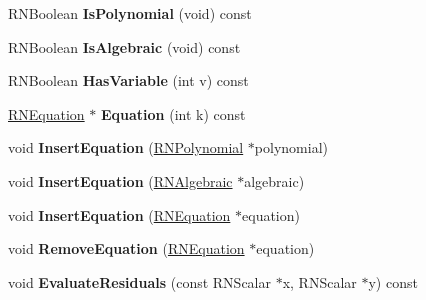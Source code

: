 \begin{DoxyCompactItemize}
\item 
R\+N\+Boolean {\bfseries Is\+Polynomial} (void) const \hypertarget{class_r_n_system_of_equations_ab83c476d4c5b85d7d35051d6e1436498}{}\label{class_r_n_system_of_equations_ab83c476d4c5b85d7d35051d6e1436498}

\item 
R\+N\+Boolean {\bfseries Is\+Algebraic} (void) const \hypertarget{class_r_n_system_of_equations_a2aebbba0c7849224dd11db3fcb0d1386}{}\label{class_r_n_system_of_equations_a2aebbba0c7849224dd11db3fcb0d1386}

\item 
R\+N\+Boolean {\bfseries Has\+Variable} (int v) const \hypertarget{class_r_n_system_of_equations_a736615d3c3239e7622c040f26d782014}{}\label{class_r_n_system_of_equations_a736615d3c3239e7622c040f26d782014}

\item 
\hyperlink{class_r_n_equation}{R\+N\+Equation} $\ast$ {\bfseries Equation} (int k) const \hypertarget{class_r_n_system_of_equations_ab4ea5976c2b1d39e9d7efb080ea87c35}{}\label{class_r_n_system_of_equations_ab4ea5976c2b1d39e9d7efb080ea87c35}

\item 
void {\bfseries Insert\+Equation} (\hyperlink{class_r_n_polynomial}{R\+N\+Polynomial} $\ast$polynomial)\hypertarget{class_r_n_system_of_equations_a2e43ff9ceb4a8b58b7c426695eb18b1a}{}\label{class_r_n_system_of_equations_a2e43ff9ceb4a8b58b7c426695eb18b1a}

\item 
void {\bfseries Insert\+Equation} (\hyperlink{class_r_n_algebraic}{R\+N\+Algebraic} $\ast$algebraic)\hypertarget{class_r_n_system_of_equations_a884c51381868c47b29227150081a4045}{}\label{class_r_n_system_of_equations_a884c51381868c47b29227150081a4045}

\item 
void {\bfseries Insert\+Equation} (\hyperlink{class_r_n_equation}{R\+N\+Equation} $\ast$equation)\hypertarget{class_r_n_system_of_equations_af10913800653ea10037c67a5b12c98ac}{}\label{class_r_n_system_of_equations_af10913800653ea10037c67a5b12c98ac}

\item 
void {\bfseries Remove\+Equation} (\hyperlink{class_r_n_equation}{R\+N\+Equation} $\ast$equation)\hypertarget{class_r_n_system_of_equations_a7abb2aa56daf971ff59f6ad252c8990a}{}\label{class_r_n_system_of_equations_a7abb2aa56daf971ff59f6ad252c8990a}

\item 
void {\bfseries Evaluate\+Residuals} (const R\+N\+Scalar $\ast$x, R\+N\+Scalar $\ast$y) const \hypertarget{class_r_n_system_of_equations_ad22802fda64a8d9e589832796c00f85f}{}\label{class_r_n_system_of_equations_ad22802fda64a8d9e589832796c00f85f}


\end{DoxyCompactItemize}
